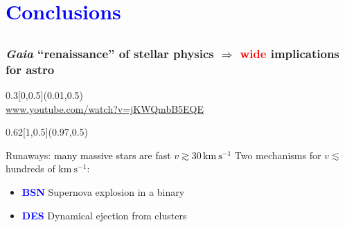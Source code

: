 \documentclass[xcolor=dvipsnames,professionalfonts, aspectratio=169]{beamer}
\begin{document}
\section{\textcolor{Blue}{Conclusions}}
\subsection{}



\begin{frame}
  \frametitle{\emph{Gaia} ``renaissance'' of stellar
    physics $\Rightarrow$ \textcolor{red}{wide} implications for astro}

  \begin{textblock}{0.3}[0,0.5](0.01,0.5)
    \centering
  \\
  \textcolor{gray!50}{\tiny \url{www.youtube.com/watch?v=jKWQmbB5EQE}}
  \end{textblock}


  \begin{textblock}{0.62}[1,0.5](0.97,0.5)
    \begin{block}{Runaways: \textcolor{black}{\normalfont
          many massive stars are fast $v\gtrsim 30\,\mathrm{km\ s^{-1}}$}}
      Two mechanisms for $v\lesssim$ hundreds of $\mathrm{km\ s^{-1}}$:
      \begin{itemize}
      \item \textcolor{Blue}{\textbf{BSN}} Supernova explosion in a binary
      \item \textcolor{Blue}{\textbf{DES}} Dynamical ejection from clusters
      \end{itemize}
    \end{block}
  \end{textblock}

\end{frame}
\end{document}
